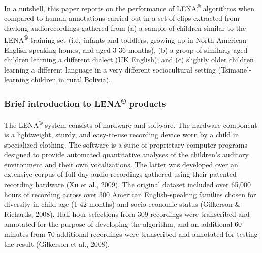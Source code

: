 \documentclass[english,table,man,floatsintext]{apa6}
\begin{document}
In a nutshell, this paper reports on the performance of LENA\textsuperscript{®} algorithms when compared to human annotations carried out in a set of clips extracted from daylong audiorecordings gathered from (a) a sample of children similar to the LENA\textsuperscript{®} training set (i.e.~infants and toddlers, growing up in North American English-speaking homes, and aged 3-36 months), (b) a group of similarly aged children learning a different dialect (UK English); and (c) slightly older children learning a different language in a very different sociocultural setting (Tsimane'-learning children in rural Bolivia).

\hypertarget{brief-introduction-to-lena-products}{%
\subsubsection{\texorpdfstring{Brief introduction to LENA\textsuperscript{®} products}{Brief introduction to LENA® products}}\label{brief-introduction-to-lena-products}}

The LENA\textsuperscript{®} system consists of hardware and software. The hardware component is a lightweight, sturdy, and easy-to-use recording device worn by a child in specialized clothing. The software is a suite of proprietary computer programs designed to provide automated quantitative analyses of the children's auditory environment and their own vocalizations. The latter was developed over an extensive corpus of full day audio recordings gathered using their patented recording hardware (Xu et al., 2009). The original dataset included over 65,000 hours of recording across over 300 American English-speaking families chosen for diversity in child age (1-42 months) and socio-economic status (Gilkerson \& Richards, 2008). Half-hour selections from 309 recordings were transcribed and annotated for the purpose of developing the algorithm, and an additional 60 minutes from 70 additional recordings were transcribed and annotated for testing the result (Gilkerson et al., 2008).
\end{document}
